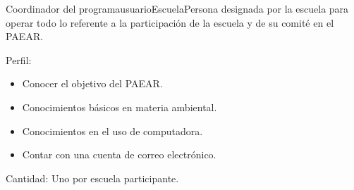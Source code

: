 \begin{actor}{Coordinador del programa}{usuarioEscuela}{Persona designada por la escuela para operar todo lo referente a la participación de la escuela y de su comité en el PAEAR.}
	\item[Perfil:] \hspace{1pt}
		\begin{itemize}
		    \item Conocer el objetivo del PAEAR.
		    \item Conocimientos básicos en materia ambiental.
		    \item Conocimientos en el uso de computadora.
		    \item Contar con una cuenta de correo electrónico.
	    \end{itemize}

	\item[Cantidad:] Uno por escuela participante.

\end{actor}